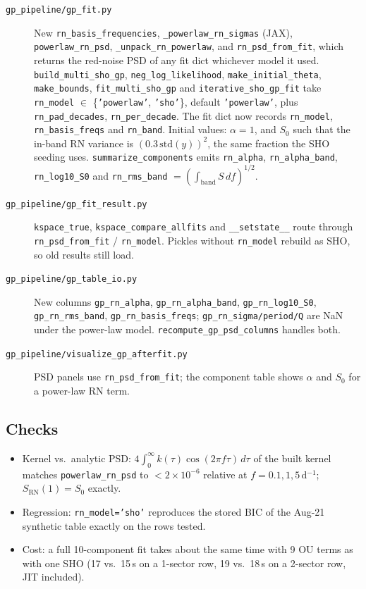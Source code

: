 \documentclass[11pt]{article}
\newcommand{\code}[1]{\texttt{#1}}
\begin{document}
\begin{description}
\item[\code{gp\_pipeline/gp\_fit.py}]
  New \code{rn\_basis\_frequencies}, \code{\_powerlaw\_rn\_sigmas} (JAX),
  \code{powerlaw\_rn\_psd}, \code{\_unpack\_rn\_powerlaw}, and \code{rn\_psd\_from\_fit},
  which returns the red-noise PSD of any fit dict whichever model it used.
  \code{build\_multi\_sho\_gp}, \code{neg\_log\_likelihood}, \code{make\_initial\_theta},
  \code{make\_bounds}, \code{fit\_multi\_sho\_gp} and \code{iterative\_sho\_gp\_fit} take
  \code{rn\_model} $\in$ \{\code{'powerlaw'}, \code{'sho'}\}, default
  \code{'powerlaw'}, plus \code{rn\_pad\_decades}, \code{rn\_per\_decade}. The fit dict
  now records \code{rn\_model}, \code{rn\_basis\_freqs} and \code{rn\_band}. Initial
  values: $\alpha = 1$, and $S_0$ such that the in-band RN variance is
  $(0.3\,\mathrm{std}(y))^2$, the same fraction the SHO seeding uses.
  \code{summarize\_components} emits \code{rn\_alpha}, \code{rn\_alpha\_band},
  \code{rn\_log10\_S0} and \code{rn\_rms\_band} $= (\int_\mathrm{band} S\,df)^{1/2}$.
\item[\code{gp\_pipeline/gp\_fit\_result.py}]
  \code{kspace\_true}, \code{kspace\_compare\_allfits} and \code{\_\_setstate\_\_} route
  through \code{rn\_psd\_from\_fit} / \code{rn\_model}. Pickles without
  \code{rn\_model} rebuild as SHO, so old results still load.
\item[\code{gp\_pipeline/gp\_table\_io.py}]
  New columns \code{gp\_rn\_alpha}, \code{gp\_rn\_alpha\_band}, \code{gp\_rn\_log10\_S0},
  \code{gp\_rn\_rms\_band}, \code{gp\_rn\_basis\_freqs}; \code{gp\_rn\_sigma/period/Q}
  are NaN under the power-law model. \code{recompute\_gp\_psd\_columns} handles both.
\item[\code{gp\_pipeline/visualize\_gp\_afterfit.py}]
  PSD panels use \code{rn\_psd\_from\_fit}; the component table shows
  $\alpha$ and $S_0$ for a power-law RN term.
\end{description}

\subsection{Checks}

\begin{itemize}
\item Kernel vs.\ analytic PSD: $4\int_0^\infty k(\tau)\cos(2\pi f\tau)\,d\tau$ of the built
  kernel matches \code{powerlaw\_rn\_psd} to $<2\times10^{-6}$ relative at
  $f = 0.1, 1, 5$\,d$^{-1}$; $S_\mathrm{RN}(1) = S_0$ exactly.
\item Regression: \code{rn\_model='sho'} reproduces the stored BIC of the Aug-21 synthetic
  table exactly on the rows tested.
\item Cost: a full 10-component fit takes about the same time with 9 OU terms as with one SHO
  (17 vs.\ 15\,s on a 1-sector row, 19 vs.\ 18\,s on a 2-sector row, JIT included).
\end{itemize}
\end{document}
